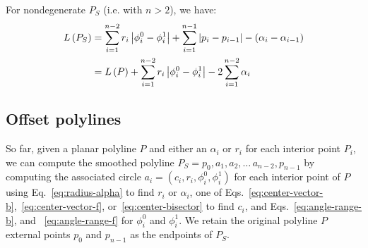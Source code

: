\documentclass{article}
\begin{document}
For nondegenerate $P_S$ (i.e. with $n>2$), we have:
%
\begin{align}
  \notag
  L\left(P_S\right) &= \sum^{n-2}_{i = 1} r_i\left|\phi^0_i - \phi^1_i\right| + \sum^{n-1}_{i=1} \left|p_i - p_{i-1}\right| - (\alpha_i - \alpha_{i-1})\\
  \label{eq:smoothpoly-len}
  &= L\left(P\right) + \sum^{n-2}_{i = 1} r_i\left|\phi^0_i - \phi^1_i\right| - 2\sum^{n-2}_{i=1} \alpha_i
\end{align}
%
\subsection{Offset polylines}
\label{sec:offset-polylines}
%
So far, given a planar polyline $P$ and either an $\alpha_i$ or $r_i$ for each interior point $P_i$, we can compute the smoothed polyline $P_S = p_0, a_1, a_2,\ldots\,a_{n-2}, p_{n-1}$ by computing the associated circle $a_i=\left(c_i, r_i, \phi^0_i, \phi^1_i\right)$ for each interior point of $P$ using Eq.~\eqref{eq:radius-alpha} to find $r_i$ or $\alpha_i$, one of Eqs.~\eqref{eq:center-vector-b},~\eqref{eq:center-vector-f}, or~\eqref{eq:center-bisector} to find $c_i$, and Eqs.~\eqref{eq:angle-range-b}, and ~\eqref{eq:angle-range-f} for $\phi^0_i$ and $\phi^1_i$.  We retain the original polyline $P$ external points $p_0$ and $p_{n-1}$ as the endpoints of $P_S$.
\end{document}
